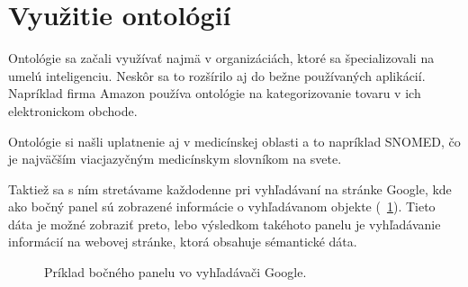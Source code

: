 \documentclass[12pt, a4paper, oneside]{book}
\begin{document}
\section{Využitie ontológií}

Ontológie sa začali využívať najmä v organizáciách, ktoré sa špecializovali na umelú inteligenciu. Neskôr sa to rozšírilo aj do bežne používaných aplikácií. Napríklad firma Amazon používa ontológie na kategorizovanie tovaru v ich elektronickom obchode.



Ontológie si našli uplatnenie aj v medicínskej oblasti a to napríklad SNOMED, čo je najväčším viacjazyčným medicínskym slovníkom na svete. 

Taktiež sa s ním stretávame každodenne pri vyhľadávaní na stránke Google, kde ako bočný panel sú zobrazené informácie o vyhľadávanom objekte (~\ref{fig:semantic_web}). Tieto dáta je možné zobraziť preto, lebo výsledkom takéhoto panelu je vyhľadávanie informácií na webovej stránke, ktorá obsahuje sémantické dáta.

\begin{figure}[h]
\label{fig:semantic_web}
\caption{Príklad bočného panelu vo vyhľadávači Google.}
\end{figure}
\end{document}
